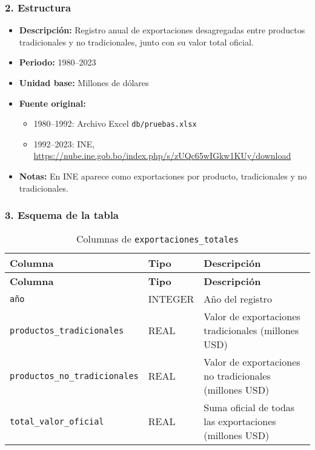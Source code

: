 \documentclass[12pt,a4paper]{article}
\begin{document}
\subsubsection*{2. Estructura}
\begin{itemize}
  \item \textbf{Descripción:} Registro anual de exportaciones desagregadas entre productos tradicionales y no tradicionales, junto con su valor total oficial.
  \item \textbf{Periodo:} 1980--2023
  \item \textbf{Unidad base:} Millones de dólares
  \item \textbf{Fuente original:}
    \begin{itemize}
      \item 1980--1992: Archivo Excel \texttt{db/pruebas.xlsx}
      \item 1992--2023: INE, \url{https://nube.ine.gob.bo/index.php/s/zUQc65wIGkw1KUy/download}
    \end{itemize}
  \item \textbf{Notas:} En INE aparece como exportaciones por producto, tradicionales y no tradicionales.
\end{itemize}

\subsubsection*{3. Esquema de la tabla}
\begin{longtable}{@{}lll@{}}
\caption{Columnas de \texttt{exportaciones\_totales}}\\
\toprule
\textbf{Columna}                      & \textbf{Tipo} & \textbf{Descripción} \\
\midrule
\endfirsthead
\toprule
\textbf{Columna}                      & \textbf{Tipo} & \textbf{Descripción} \\
\midrule
\endhead
\bottomrule
\endfoot
\texttt{año}                           & INTEGER & Año del registro \\
\texttt{productos\_tradicionales}      & REAL    & Valor de exportaciones tradicionales (millones USD) \\
\texttt{productos\_no\_tradicionales}   & REAL    & Valor de exportaciones no tradicionales (millones USD) \\
\texttt{total\_valor\_oficial}         & REAL    & Suma oficial de todas las exportaciones (millones USD) \\
\end{longtable}
\end{document}
